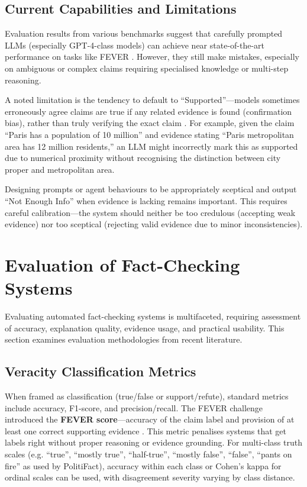 \documentclass[12pt,a4paper]{article}
\begin{document}
\subsection{Current Capabilities and Limitations}

Evaluation results from various benchmarks suggest that carefully prompted LLMs (especially GPT-4-class models) can achieve near state-of-the-art performance on tasks like FEVER \citep{thorne2018fever}. However, they still make mistakes, especially on ambiguous or complex claims requiring specialised knowledge or multi-step reasoning.

A noted limitation is the tendency to default to ``Supported''—models sometimes erroneously agree claims are true if any related evidence is found (confirmation bias), rather than truly verifying the exact claim \citep{zhang2023siren}. For example, given the claim ``Paris has a population of 10 million'' and evidence stating ``Paris metropolitan area has 12 million residents,'' an LLM might incorrectly mark this as supported due to numerical proximity without recognising the distinction between city proper and metropolitan area.

Designing prompts or agent behaviours to be appropriately sceptical and output ``Not Enough Info'' when evidence is lacking remains important. This requires careful calibration—the system should neither be too credulous (accepting weak evidence) nor too sceptical (rejecting valid evidence due to minor inconsistencies).

\section{Evaluation of Fact-Checking Systems}

Evaluating automated fact-checking systems is multifaceted, requiring assessment of accuracy, explanation quality, evidence usage, and practical usability. This section examines evaluation methodologies from recent literature.

\subsection{Veracity Classification Metrics}

When framed as classification (true/false or support/refute), standard metrics include accuracy, F1-score, and precision/recall. The FEVER challenge introduced the \textbf{FEVER score}—accuracy of the claim label and provision of at least one correct supporting evidence \citep{thorne2018fever}. This metric penalises systems that get labels right without proper reasoning or evidence grounding. For multi-class truth scales (e.g. ``true'', ``mostly true'', ``half-true'', ``mostly false'', ``false'', ``pants on fire'' as used by PolitiFact), accuracy within each class or Cohen's kappa for ordinal scales can be used, with disagreement severity varying by class distance.
\end{document}
